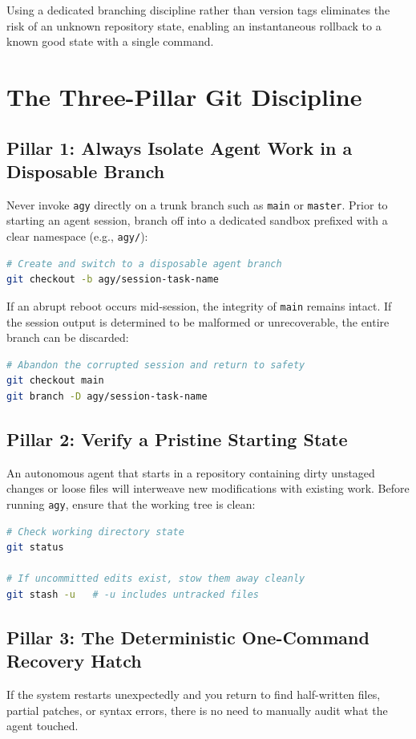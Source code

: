 \documentclass[11pt,letterpaper]{article}
\begin{document}
Using a dedicated branching discipline rather than version tags eliminates the risk of an unknown repository state, enabling an instantaneous rollback to a known good state with a single command.

\section{The Three-Pillar Git Discipline}

\subsection{Pillar 1: Always Isolate Agent Work in a Disposable Branch}
Never invoke \texttt{agy} directly on a trunk branch such as \texttt{main} or \texttt{master}. Prior to starting an agent session, branch off into a dedicated sandbox prefixed with a clear namespace (e.g., \texttt{agy/}):

\begin{lstlisting}[language=bash]
# Create and switch to a disposable agent branch
git checkout -b agy/session-task-name
\end{lstlisting}

If an abrupt reboot occurs mid-session, the integrity of \texttt{main} remains intact. If the session output is determined to be malformed or unrecoverable, the entire branch can be discarded:

\begin{lstlisting}[language=bash]
# Abandon the corrupted session and return to safety
git checkout main
git branch -D agy/session-task-name
\end{lstlisting}

\subsection{Pillar 2: Verify a Pristine Starting State}
An autonomous agent that starts in a repository containing dirty unstaged changes or loose files will interweave new modifications with existing work. Before running \texttt{agy}, ensure that the working tree is clean:

\begin{lstlisting}[language=bash]
# Check working directory state
git status

# If uncommitted edits exist, stow them away cleanly
git stash -u   # -u includes untracked files
\end{lstlisting}

\subsection{Pillar 3: The Deterministic One-Command Recovery Hatch}
If the system restarts unexpectedly and you return to find half-written files, partial patches, or syntax errors, there is no need to manually audit what the agent touched. 
\end{document}

